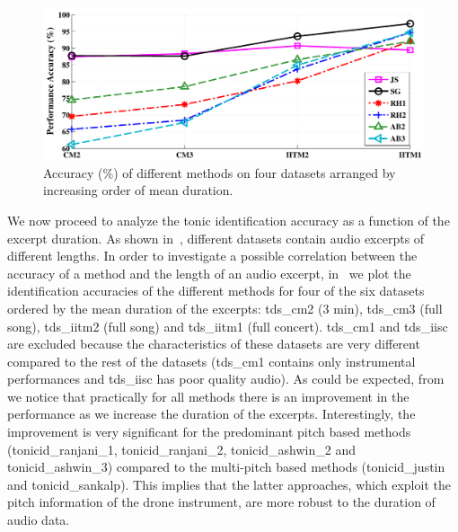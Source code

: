 {{\begin{figure}
	\begin{center}
		\includegraphics[width=\figSizeNinety]{ch05_preprocessing/figures/Accuracy_Length.pdf}
	\end{center}
	\caption{Accuracy (\%) of different methods on four datasets arranged
		by increasing order of mean duration.}
	\label{fig:tonic_id_accuracy_vs_length}
\end{figure}


We now proceed to analyze the tonic identification accuracy as a function of the excerpt duration. As shown in~, different datasets contain audio excerpts of different lengths. In order to investigate a possible correlation between the accuracy of a method and the length of an audio
excerpt, in~ we plot the identification accuracies of the different methods for four of the six datasets ordered
by the mean duration of the excerpts: \acrshort{tds_cm2} (3 min), \acrshort{tds_cm3} (full song), \acrshort{tds_iitm2} (full song) and \acrshort{tds_iitm1} (full concert). \acrshort{tds_cm1} and \acrshort{tds_iisc} are excluded because the characteristics of these datasets are very different compared to the rest of the datasets (\acrshort{tds_cm1} contains only instrumental performances and \acrshort{tds_iisc} has poor quality audio). As could be expected, from~ we notice that practically for all methods there is an improvement in the performance as we increase the duration
of the excerpts. Interestingly, the improvement is very significant for the predominant pitch based methods (\acrshort{tonicid_ranjani_1}, \acrshort{tonicid_ranjani_2}, \acrshort{tonicid_ashwin_2} and \acrshort{tonicid_ashwin_3}) compared to the multi-pitch based methods (\acrshort{tonicid_justin} and \acrshort{tonicid_sankalp}). This implies that the latter approaches, which exploit the pitch information of the drone instrument, are more robust to the duration of audio data.

}}

